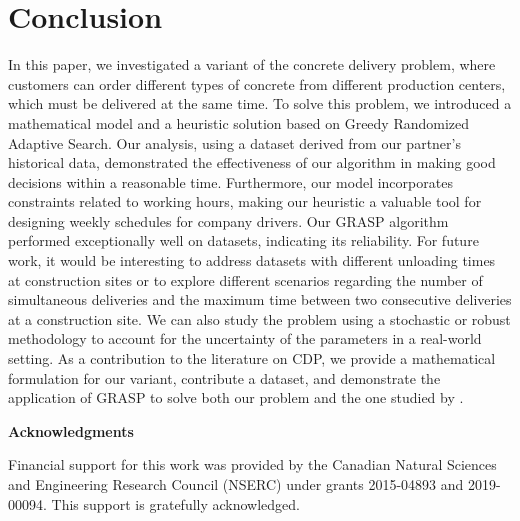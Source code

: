 \documentclass{article}
\begin{document}
\section{Conclusion}
\label{concl}

In this paper, we investigated a variant of the concrete delivery problem, where customers can order different types of concrete from different production centers, which must be delivered at the same time. To solve this problem, we introduced a mathematical model and a heuristic solution based on Greedy Randomized Adaptive Search. Our analysis, using a dataset derived from our partner's historical data, demonstrated the effectiveness of our algorithm in making good decisions within a reasonable time. Furthermore, our model incorporates constraints related to working hours, making our heuristic a valuable tool for designing weekly schedules for company drivers. Our GRASP algorithm performed exceptionally well on \cite{kinable2014concrete} datasets, indicating its reliability. For future work, it would be interesting to address datasets with different unloading times at construction sites or to explore different scenarios regarding the number of simultaneous deliveries and the maximum time between two consecutive deliveries at a construction site. We can also study the problem using a stochastic or robust methodology to account for the uncertainty of the parameters in a real-world setting. As a contribution to the literature on CDP, we provide a mathematical formulation for our variant, contribute a dataset, and demonstrate the application of GRASP to solve both our problem and the one studied by \cite{kinable2014concrete}.
\vspace{0.1in}

\vspace{1.5cm} \noindent \textbf{Acknowledgments}

Financial support for this work was provided by the Canadian Natural Sciences and Engineering Research Council (NSERC) under grants 2015-04893 and 2019-00094. This support is gratefully acknowledged.




\end{document}
